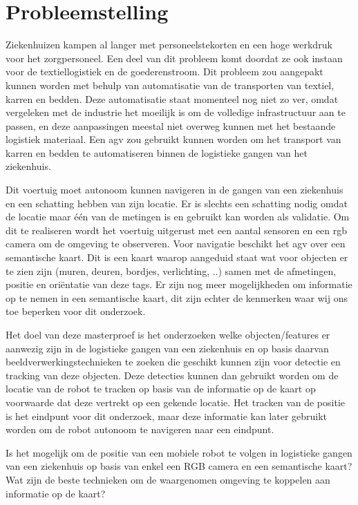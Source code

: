 
\chapter{Probleemstelling}

Ziekenhuizen kampen al langer met personeelstekorten en een hoge werkdruk voor het zorgpersoneel. Een deel van dit probleem komt doordat ze ook instaan voor de textiellogistiek en de goederenstroom.
Dit probleem zou aangepakt kunnen worden met behulp van automatisatie van de transporten van textiel, karren en bedden. Deze automatisatie staat momenteel nog niet zo ver, omdat vergeleken met de industrie het moeilijk is om de volledige
infrastructuur aan te passen, en deze aanpassingen meestal niet overweg kunnen met het bestaande logistiek materiaal. Een \gls{agv} zou gebruikt kunnen worden om het transport van karren en bedden te automatiseren binnen de logistieke gangen van het ziekenhuis.

Dit voertuig moet autonoom kunnen navigeren in de gangen van een ziekenhuis en een schatting hebben van zijn locatie.
Er is slechts een schatting nodig omdat de locatie maar \'{e}\'{e}n van de metingen is en gebruikt kan worden als validatie.
Om dit te realiseren
wordt het voertuig uitgerust met een aantal sensoren en een \gls{rgb} camera om de omgeving te observeren. Voor navigatie beschikt het \gls{agv}
over een semantische kaart.
Dit is een kaart waarop aangeduid staat wat voor objecten er te zien zijn (muren, deuren, bordjes, verlichting, ..) samen met de afmetingen, positie en ori\"{e}ntatie van deze tags.
Er zijn nog meer mogelijkheden om informatie op te nemen in een semantische kaart, dit zijn echter de kenmerken waar wij ons toe beperken voor dit onderzoek.

Het doel van deze masterproef is het onderzoeken welke objecten/features er aanwezig zijn in de logistieke gangen van een ziekenhuis en op basis daarvan
beeldverwerkingstechnieken te zoeken die geschikt kunnen zijn voor detectie en tracking van deze objecten.
Deze detecties kunnen dan gebruikt worden om de locatie van de robot te tracken op basis van de informatie op de kaart op voorwaarde dat deze vertrekt op een gekende locatie.
Het tracken van de positie is het eindpunt voor dit onderzoek, maar deze informatie kan later gebruikt worden om de robot autonoom te navigeren naar een eindpunt.

Is het mogelijk om de positie van een mobiele robot te volgen in logistieke gangen van een ziekenhuis op basis van enkel een RGB camera en een
semantische kaart? Wat zijn de beste technieken om de waargenomen omgeving te koppelen aan informatie op de kaart?